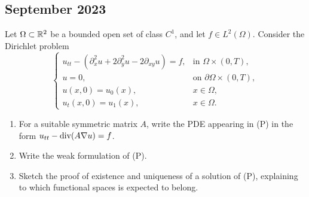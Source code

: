 \subsection{September 2023}
\begin{exercise}
    Let \(\Omega \subset \mathbb{R}^2\) be a bounded open set of class \(C^1\), and let \(f \in L^2(\Omega)\). Consider the Dirichlet problem
    \begin{equation*}
        \begin{cases}
            u_{tt} - \left(\partial_x^2 u + 2 \partial_y^2 u - 2 \partial_{xy} u\right) = f, & \text{in } \Omega \times (0, T),          \\
            u = 0,                                                                           & \text{on } \partial \Omega \times (0, T), \\
            u(x,0) = u_0(x),                                                                 & x \in \Omega,                             \\
            u_t(x,0) = u_1(x),                                                               & x \in \Omega.
        \end{cases}
        \tag{(P)}
    \end{equation*}
    \begin{enumerate}
        \item For a suitable symmetric matrix \(A\), write the PDE appearing in (P) in the
              form \(u_{tt} - \text{div}(A \nabla u) = f\).
        \item Write the weak formulation of (P).
        \item Sketch the proof of existence and uniqueness of a solution of (P), explaining
              to which functional spaces is expected to belong.
    \end{enumerate}
\end{exercise}
